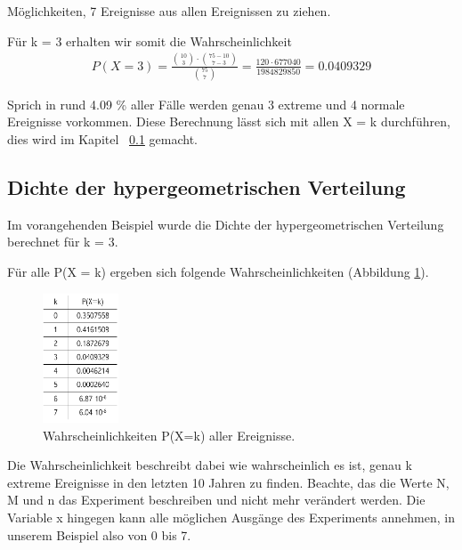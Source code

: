 \begin{refsection}
Möglichkeiten, 7 Ereignisse aus allen Ereignissen zu ziehen.


Für k = 3 erhalten wir somit die Wahrscheinlichkeit
\begin{align*}
P(X = 3) = \frac{ \binom{10}{3} \cdot \binom{75-10}{7-3}}{ \binom{75}{7} } = \frac{ 120 \cdot 677040}{ 1984829850 } = 0.0409329
\end{align*}

Sprich in rund 4.09 \% aller Fälle werden genau 3 extreme und 4 normale Ereignisse vorkommen. Diese Berechnung lässt sich mit allen X = k durchführen, dies wird im Kapitel ~\ref{Dichtehyper}  gemacht.


\subsection{Dichte der hypergeometrischen Verteilung} \label{Dichtehyper}
Im vorangehenden Beispiel wurde die Dichte der hypergeometrischen Verteilung berechnet für k = 3. 


Für alle P(X = k) ergeben sich folgende Wahrscheinlichkeiten (Abbildung \ref{TabHyper}).

\begin{figure}[htbp]
\centering
\includegraphics[width=0.2\textwidth]{extrem/TabHyper.pdf}
\caption{Wahrscheinlichkeiten P(X=k) aller Ereignisse.}
\label{TabHyper}
\end{figure}

Die Wahrscheinlichkeit beschreibt dabei wie wahrscheinlich es ist, genau k extreme Ereignisse in den letzten 10 Jahren zu finden.
Beachte, das die Werte N, M und n das Experiment beschreiben und nicht mehr verändert werden. Die Variable x hingegen kann alle möglichen Ausgänge des Experiments annehmen, in unserem Beispiel also von 0 bis 7.


\end{refsection}
